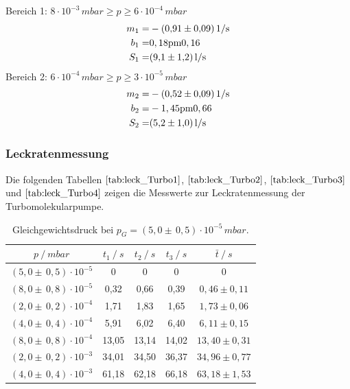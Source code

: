 Bereich 1: $8 \cdot 10^{-3} \, \si{mbar} \geq p \geq 6 \cdot 10^{-4} \, \si{mbar}$\\
\begin{align*}
	m_1=& -\SI{0,91 \pm 0,09}{1/s}\\
	b_1=& \si{0,18 \pm 0,16}\\
	S_1=& \SI{9,1 \pm 1,2}{l/s}
\end{align*}
Bereich 2: $6 \cdot 10^{-4} \, \si{mbar} \geq p \geq 3 \cdot 10^{-5} \, \si{mbar}$\\
\begin{align*}
	m_2=& -\SI{0,52 \pm 0,09}{1/s}\\
	b_2=& -\si{1,45 \pm 0,66}\\
	S_2=& \SI{5,2 \pm 1,0}{l/s}
\end{align*}

\subsubsection{Leckratenmessung}
Die folgenden Tabellen $\ref{tab:leck_Turbo1}$, $\ref{tab:leck_Turbo2}$, $\ref{tab:leck_Turbo3}$ und $\ref{tab:leck_Turbo4}$ zeigen die Messwerte zur Leckratenmessung der Turbomolekularpumpe.

\begin{table}[H]
\centering
\begin{tabular}{c|c|c|c|c}
	{$p \:/\: \si{mbar}$} & {$t_1 \:/\: \si{s} $} & {$t_2 \:/\: \si{s} $} & {$t_3 \:/\: \si{s} $} & {$\bar{t} \:/\: \si{s}$}\\
\midrule
$(5,0 \pm \, 0,5)\cdot 10^{-5}$ &0 &0 &0 &0\\
$(8,0 \pm \, 0,8)\cdot 10^{-5}$ &   0,32 &  0,66 &  0,39 & $0,46 \pm 0,11$\\
$(2,0 \pm \, 0,2)\cdot 10^{-4}$ &   1,71  &  1,83 &  1,65 & $1,73 \pm 0,06$\\
$(4,0 \pm \, 0,4)\cdot 10^{-4}$ &   5,91 &  6,02 &  6,40 & $6,11 \pm 0,15$\\
$(8,0 \pm \, 0,8)\cdot 10^{-4}$ &   13,05 &  13,14 &  14,02 & $13,40 \pm 0,31$\\
$(2,0 \pm \, 0,2)\cdot 10^{-3}$ &   34,01 &  34,50 &  36,37 & $34,96 \pm 0,77$\\
$(4,0 \pm \, 0,4)\cdot 10^{-3}$ &  61,18 & 62,18 & 66,18 & $63,18 \pm 1,53$\\
\end{tabular}
\caption{Gleichgewichtsdruck bei $p_G=(5,0 \pm \, 0,5)\cdot 10^{-5} \, \si{mbar}$.}
\label{tab:leck_Turbo1}
\end{table}

